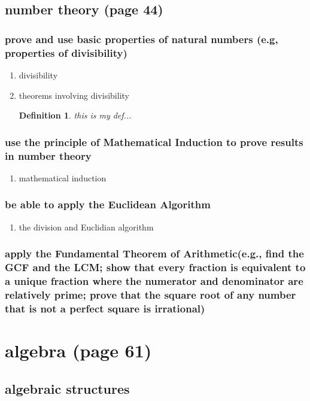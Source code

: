 \documentclass[11pt]{article}
\newtheorem{mydef}{Definition}
\begin{document}
\subsection{number theory (page 44)}
\label{sec:org759370d}
\subsubsection{prove and use basic properties of natural numbers (e.g, properties of divisibility)}
\label{sec:orgabd7d93}
\begin{enumerate}
\item divisibility
\label{sec:org7a8a438}
\item theorems involving divisibility
\label{sec:org05b2c9e}

\begin{mydef}
this is my def...
\end{mydef}
\end{enumerate}
\subsubsection{use the principle of Mathematical Induction to prove results in number theory}
\label{sec:org13b3bbd}
\begin{enumerate}
\item mathematical induction
\label{sec:orgcf1e656}
\end{enumerate}
\subsubsection{be able to apply the Euclidean Algorithm}
\label{sec:orgbc0acfa}
\begin{enumerate}
\item the division and Euclidian algorithm
\label{sec:orga53d2c9}
\end{enumerate}
\subsubsection{apply the Fundamental Theorem of Arithmetic(e.g., find the GCF and the  LCM; show that every fraction is equivalent to a unique fraction where the numerator and denominator are relatively prime; prove that the square root of any number that is not a perfect square is irrational)}
\label{sec:org53f0e04}
\section{algebra (page 61)}
\label{sec:org59d361a}
\subsection{algebraic structures}
\label{sec:orgc21b8d5}
\end{document}
